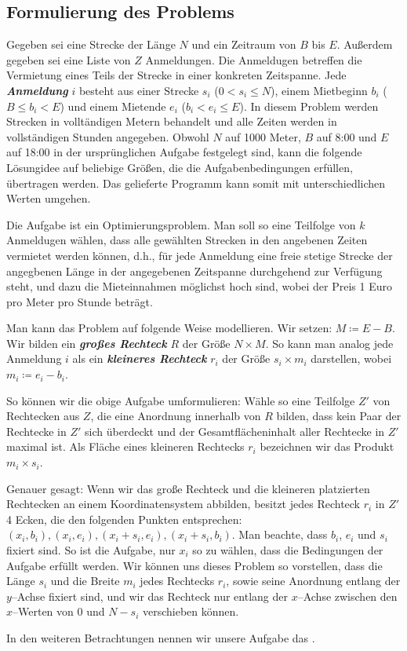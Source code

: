 \subsection{Formulierung des Problems}\label{sec:definitionen}
Gegeben sei eine Strecke der Länge $N$ und ein Zeitraum von $B$ bis $E$.
Außerdem gegeben sei eine Liste von $Z$ Anmeldungen. 
Die Anmeldugen betreffen die Vermietung eines Teils der Strecke in einer konkreten Zeitspanne.
Jede \textbf{\textit{Anmeldung}} $i$ besteht aus einer Strecke $s_i$ ($0 < s_i \leqslant N$),
einem Mietbeginn $b_i$ ($B \leqslant b_i < E$) und einem Mietende $e_i$ ($b_i < e_i \leqslant E$).
In diesem Problem werden Strecken in volltändigen Metern behandelt 
und alle Zeiten werden in vollständigen Stunden angegeben.
Obwohl $N$ auf 1000 Meter, $B$ auf 8:00 und $E$ auf 18:00 in der ursprünglichen Aufgabe festgelegt sind,
kann die folgende Lösungidee auf beliebige Größen, die die Aufgabenbedingungen erfüllen, übertragen werden.
Das gelieferte Programm kann somit mit unterschiedlichen Werten umgehen.

Die Aufgabe ist ein Optimierungsproblem.
Man soll so eine Teilfolge von $k$ Anmeldugen wählen,
dass alle gewählten Strecken in den angebenen Zeiten vermietet werden können, d.h.,
für jede Anmeldung eine freie stetige Strecke der angegbenen Länge 
in der angegebenen Zeitspanne durchgehend zur Verfügung steht,
und dazu die Mieteinnahmen möglichst hoch sind, wobei der Preis 1 Euro pro Meter pro Stunde beträgt.

Man kann das Problem auf folgende Weise modellieren. 
Wir setzen: $M \coloneqq E - B$.
Wir bilden ein \textit{\textbf{großes Rechteck}} $R$ der Größe $N \times M$.
So kann man analog jede Anmeldung $i$ als ein \textit{\textbf{kleineres Rechteck}}
$r_i$ der Größe $s_i \times m_i$ darstellen, wobei $m_i \coloneqq e_i - b_i$.

So können wir die obige Aufgabe umformulieren:
Wähle so eine Teilfolge $Z'$ von Rechtecken aus $Z$,
die eine Anordnung innerhalb von $R$ bilden,
dass kein Paar der Rechtecke in $Z'$ sich überdeckt und
der Gesamtflächeninhalt aller Rechtecke in $Z'$ maximal ist.
Als Fläche eines kleineren Rechtecks $r_i$ bezeichnen wir das Produkt $m_i \times s_i$.

Genauer gesagt: Wenn wir das große Rechteck und die kleineren platzierten Rechtecken
an einem Koordinatensystem abbilden,
besitzt jedes Rechteck $r_i$ in $Z'$ 4 Ecken,
die den folgenden Punkten entsprechen:
$(x_i, b_i), (x_i, e_i), (x_i + s_i, e_i), (x_i + s_i, b_i)$.
Man beachte, dass $b_i$, $e_i$ und $s_i$ fixiert sind. 
So ist die Aufgabe, nur $x_i$ so zu wählen, dass die Bedingungen der Aufgabe erfüllt werden.
Wir können uns dieses Problem so vorstellen, dass die Länge $s_i$ und die Breite $m_i$
jedes Rechtecks $r_i$, sowie seine Anordnung entlang der $y$--Achse fixiert sind,
und wir das Rechteck nur entlang der $x$--Achse zwischen den $x$--Werten von 0 und $N-s_i$ verschieben können.

In den weiteren Betrachtungen nennen wir unsere Aufgabe das \fp.